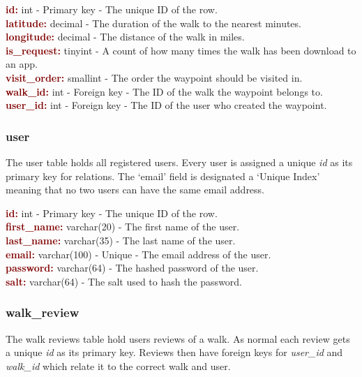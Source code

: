 \documentclass[11pt,a4paper]{report}
\begin{document}
\textbf{\textcolor{Maroon}{id:}} int - Primary key - The unique ID of the row. \\
\textbf{\textcolor{Maroon}{latitude:}} decimal -  The duration of the walk to the nearest minutes.\\
\textbf{\textcolor{Maroon}{longitude:}} decimal - The distance of the walk in miles.\\
\textbf{\textcolor{Maroon}{is\_request:}} tinyint - A count of how many times the walk has been download to an app. \\
\textbf{\textcolor{Maroon}{visit\_order:}} smallint - The order the waypoint should be visited in. \\
\textbf{\textcolor{Maroon}{walk\_id:}} int - Foreign key - The ID of the walk the waypoint belongs to.\\
\textbf{\textcolor{Maroon}{user\_id:}} int - Foreign key - The ID of the user who created the waypoint.

\subsubsection{user}
The user table holds all registered users. Every user is assigned a unique \textit{id} as its primary key for relations. The `email' field is designated a `Unique Index' meaning that no two users can have the same email address. 

\textbf{\textcolor{Maroon}{id:}} int - Primary key - The unique ID of the row. \\
\textbf{\textcolor{Maroon}{first\_name:}} varchar(20) -  The first name of the user.\\
\textbf{\textcolor{Maroon}{last\_name:}} varchar(35) - The last name of the user.\\
\textbf{\textcolor{Maroon}{email:}} varchar(100) - Unique - The email address of the user. \\
\textbf{\textcolor{Maroon}{password:}} varchar(64) - The hashed password of the user. \\
\textbf{\textcolor{Maroon}{salt:}} varchar(64) - The salt used to hash the password.

\subsubsection{walk\_review}
The walk reviews table hold users reviews of a walk. As normal each review gets a unique \textit{id} as its primary key. Reviews then have foreign keys for \textit{user\_id} and \textit{walk\_id} which relate it to the correct walk and user. 
\end{document}
